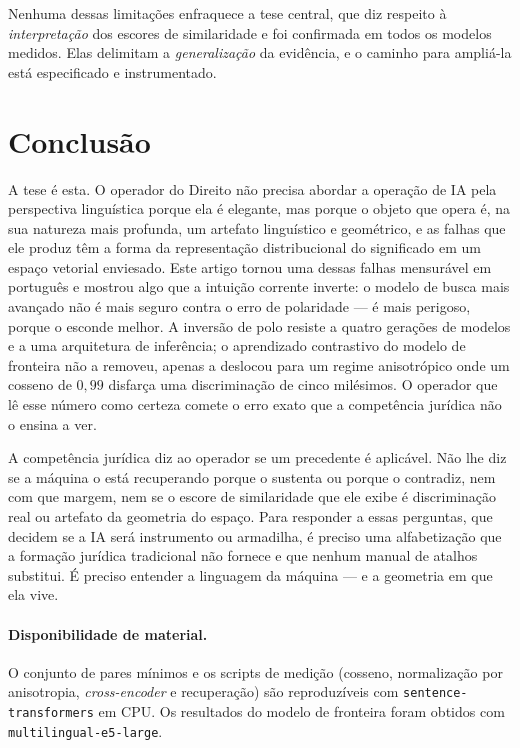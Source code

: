 \documentclass[11pt]{article}
\begin{document}
Nenhuma dessas limitações enfraquece a tese central, que diz respeito à
\emph{interpretação} dos escores de similaridade e foi confirmada em todos os
modelos medidos. Elas delimitam a \emph{generalização} da evidência, e o caminho
para ampliá-la está especificado e instrumentado.

\section{Conclusão}

A tese é esta. O operador do Direito não precisa abordar a operação de IA pela
perspectiva linguística porque ela é elegante, mas porque o objeto que opera é, na
sua natureza mais profunda, um artefato linguístico e geométrico, e as falhas que
ele produz têm a forma da representação distribucional do significado em um espaço
vetorial enviesado. Este artigo tornou uma dessas falhas mensurável em português e
mostrou algo que a intuição corrente inverte: o modelo de busca mais avançado não
é mais seguro contra o erro de polaridade --- é mais perigoso, porque o esconde
melhor. A inversão de polo resiste a quatro gerações de modelos e a uma arquitetura
de inferência; o aprendizado contrastivo do modelo de fronteira não a removeu,
apenas a deslocou para um regime anisotrópico onde um cosseno de $0{,}99$ disfarça
uma discriminação de cinco milésimos. O operador que lê esse número como certeza
comete o erro exato que a competência jurídica não o ensina a ver.

A competência jurídica diz ao operador se um precedente é aplicável. Não lhe diz
se a máquina o está recuperando porque o sustenta ou porque o contradiz, nem com
que margem, nem se o escore de similaridade que ele exibe é discriminação real ou
artefato da geometria do espaço. Para responder a essas perguntas, que decidem se
a IA será instrumento ou armadilha, é preciso uma alfabetização que a formação
jurídica tradicional não fornece e que nenhum manual de atalhos substitui. É
preciso entender a linguagem da máquina --- e a geometria em que ela vive.

\paragraph{Disponibilidade de material.} O conjunto de pares mínimos e os scripts
de medição (cosseno, normalização por anisotropia, \textit{cross-encoder} e
recuperação) são reproduzíveis com \texttt{sentence-transformers} em CPU. Os
resultados do modelo de fronteira foram obtidos com \texttt{multilingual-e5-large}.
\end{document}
